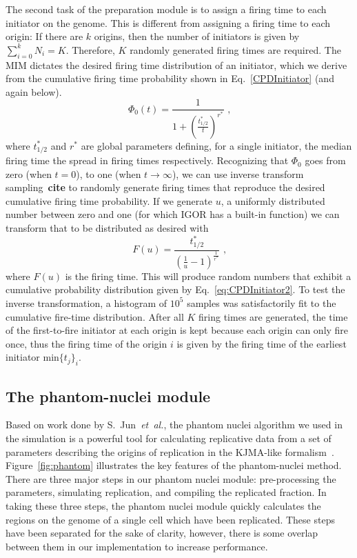 		The second task of the preparation module is to assign a firing time to each initiator on the genome.
		This is different from assigning a firing time to each origin: If there are $k$ origins, then the number of initiators is given by $\sum\nolimits_{i=0}^k N_i = K$.
		Therefore, $K$ randomly generated firing times are required.
		The MIM dictates the desired firing time distribution of an initiator, which we derive from the cumulative firing time probability shown in Eq.~\ref{CPDInitiator} (and again below).
		\begin{equation} \label{eq:CPDInitiator2}
			\Phi_0(t) = \frac{1}{1+\left(\frac{t^*_{1/2}}{t}\right)^{r^*}}\text{ ,}
		\end{equation}
		where $t^*_{1/2}$ and $r^*$ are global parameters defining, for a single initiator, the median firing time the spread in firing times respectively. 
		Recognizing that $\Phi_0$ goes from zero (when $t=0$), to one (when $t \rightarrow \infty$), we can use inverse transform sampling~\textbf{cite} to randomly generate firing times that reproduce the desired cumulative firing time probability.
		If we generate $u$, a uniformly distributed number between zero and one (for which IGOR has a built-in function) we can transform that to be distributed as desired with
		\begin{equation}
			F(u) = \frac{t^*_{1/2}}{\left(\frac{1}{u}-1\right)^\frac{1}{r^*}} \text{ ,}
		\end{equation}
		where $F(u)$ is the firing time.
		This will produce random numbers that exhibit a cumulative probability distribution given by Eq.~\ref{eq:CPDInitiator2}.
		To test the inverse transformation, a histogram of $10^5$ samples was satisfactorily fit to the cumulative fire-time distribution.
		After all $K$ firing times are generated, the time of the first-to-fire initiator at each origin is kept because each origin can only fire once, thus the firing time of the origin $i$ is given by the firing time of the earliest initiator $\text{min}\{t_j\}_i$.
		
		
		\subsection{The phantom-nuclei module}
		\label{subsec:PhanNuc}
		
		Based on work done by S.~Jun~\emph{et~al.}, the phantom nuclei algorithm we used in the simulation is a powerful tool for calculating replicative data from a set of parameters describing the origins of replication in the KJMA-like formalism~\cite{KJMA1}.
		Figure~\ref{fig:phantom} illustrates the key features of the phantom-nuclei method.
		There are three major steps in our phantom nuclei module: pre-processing the parameters, simulating replication, and compiling the replicated fraction.
		In taking these three steps, the phantom nuclei module quickly calculates the regions on the genome of a single cell which have been replicated.
		These steps have been separated for the sake of clarity, however, there is some overlap between them in our implementation to increase performance.
		
